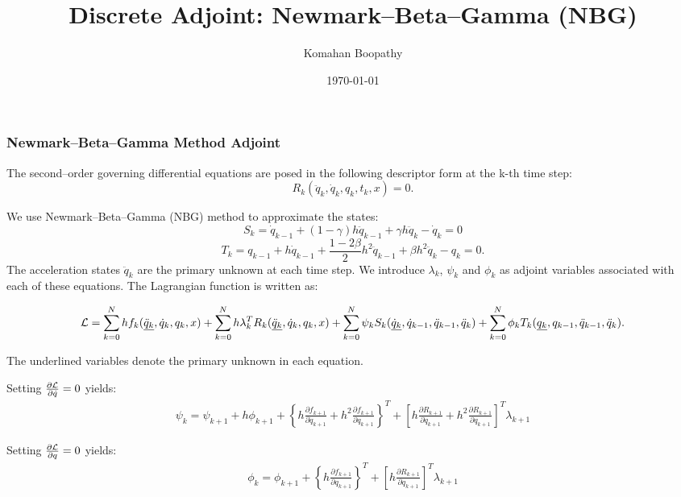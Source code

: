 \documentclass{beamer}
\title[\hspace{-0.2cm} DIRK Adjoint]
{
Discrete Adjoint: Newmark--Beta--Gamma (NBG)
}
\author[Komahan Boopathy]
{
  \Large {Komahan Boopathy}\\
}
\institute
{
  \large Georgia Institute of Technology\\
 School of Aerospace Engineering\\
 Atlanta, GA
}
\date
{
\small \today
}
\newcommand{\pd}[2]{\frac{\partial #1}{\partial #2}}
\begin{document}
\begin{frame}
  \titlepage
\end{frame}


\begin{frame}[allowframebreaks] \frametitle{Newmark--Beta--Gamma Method Adjoint}

  \tiny{
    
    The second--order governing differential equations are posed in the following
    descriptor form at the k-th time step:
    $$ R_k(\ddot{q}_k, \dot{q}_k, q_k, t_k , x) = 0.$$

    We use Newmark--Beta--Gamma (NBG) method to approximate the states:
    $$ S_k =  \dot{q}_{k-1}  + (1-\gamma) h \ddot{q}_{k-1} +  \gamma h \ddot{q}_{k}- \dot{q}_k=0$$ 
    $$ T_k =  {q}_{k-1}  + h \dot{q}_{k-1} +\frac{1-2\beta}{2} h^2\ddot{q}_{k-1}+ \beta h^2 \ddot{q}_k-{q}_k=0.$$
    The acceleration states $\ddot{q}_k$ are the primary unknown at each time step. We introduce $\lambda_k$, $\psi_k$ and $\phi_k$ as adjoint variables
    associated with each of these equations. The Lagrangian function is written
    as:
    
    $${\cal{L}} = \sum_{k=0}^N h f_k(\underline{\ddot{q}_k},
    \dot{q}_k, q_k, x) + \sum_{k=0}^N h \lambda_k^T
    R_k(\underline{\ddot{q}_k}, \dot{q}_k, q_k, x) + \sum_{k=0}^N \psi_k
    S_k(\underline{\dot{q}_k}, \dot{q}_{k-1}, \ddot{q}_{k-1},
    \ddot{q}_{k}) + \sum_{k=0}^N \phi_k T_k(\underline{{q}_k},
         {q}_{k-1}, \ddot{q}_{k-1}, \ddot{q}_{k}). $$
         
         The underlined variables denote the primary unknown in each
         equation.
         
         \framebreak
         
         Setting $\pd{\cal{L}}{\dot{q}} = 0$ yields:
         \begin{equation}
           \begin{split}
             \psi_k = \psi_{k+1} + h \phi_{k+1}  + \left\{ h \pd{f_{k+1}}{\dot{q}_{k+1}} +  h^2 \pd{f_{k+1}}{{q}_{k+1}} \right\}^T + \left[ h \pd{R_{k+1}}{\dot{q}_{k+1}} +  h^2 \pd{R_{k+1}}{{q}_{k+1}} \right]^T \lambda_{k+1} 
           \end{split}
         \end{equation}


         Setting $\pd{\cal{L}}{{q}} = 0$ yields:
         \begin{equation}
           \begin{split}
             \phi_k = \phi_{k+1} + \left\{h \pd{f_{k+1}}{{q}_{k+1}} \right\}^T + \left[ h \pd{R_{k+1}}{{q}_{k+1}} \right]^T \lambda_{k+1}  
           \end{split}
         \end{equation}
         
}
\end{frame}
\end{document}
